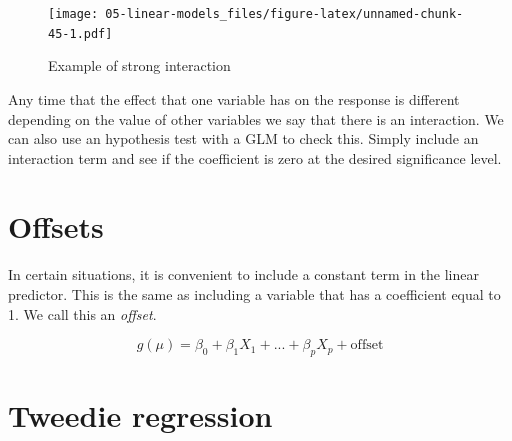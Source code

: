 \documentclass[openany]{book}
\newenvironment{Shaded}{\begin{snugshade}}{\end{snugshade}}
\newcommand{\DataTypeTok}[1]{\textcolor[rgb]{0.13,0.29,0.53}{#1}}
\newcommand{\FloatTok}[1]{\textcolor[rgb]{0.00,0.00,0.81}{#1}}
\newcommand{\KeywordTok}[1]{\textcolor[rgb]{0.13,0.29,0.53}{\textbf{#1}}}
\newcommand{\NormalTok}[1]{#1}
\newcommand{\OperatorTok}[1]{\textcolor[rgb]{0.81,0.36,0.00}{\textbf{#1}}}
\newcommand{\StringTok}[1]{\textcolor[rgb]{0.31,0.60,0.02}{#1}}
\begin{document}
\begin{Shaded}
\end{Shaded}

\begin{figure}
\centering
\texttt{[image: 05-linear-models\_files/figure-latex/unnamed-chunk-45-1.pdf]}
\caption{\label{fig:unnamed-chunk-45}Example of strong interaction}
\end{figure}

Any time that the effect that one variable has on the response is different depending on the value of other variables we say that there is an interaction. We can also use an hypothesis test with a GLM to check this. Simply include an interaction term and see if the coefficient is zero at the desired significance level.

\hypertarget{offsets}{%
\section{Offsets}\label{offsets}}

In certain situations, it is convenient to include a constant term in the linear predictor. This is the same as including a variable that has a coefficient equal to 1. We call this an \emph{offset}.

\[g(\mu) = \beta_0 + \beta_1 X_1 + ... + \beta_p X_p + \text{offset}\]

\hypertarget{tweedie-regression}{%
\section{Tweedie regression}\label{tweedie-regression}}
\end{document}
